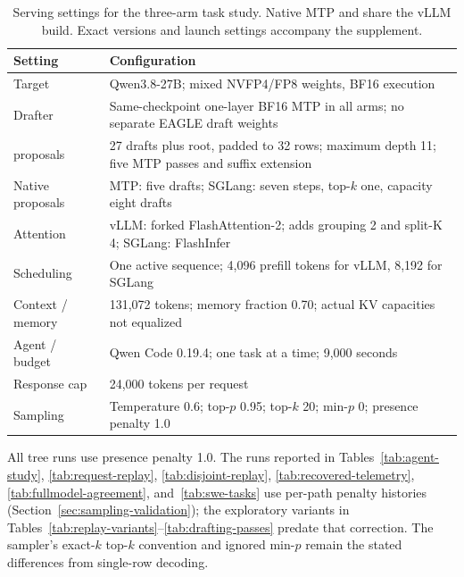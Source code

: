 \begin{table}[!htbp]
\caption{Serving settings for the three-arm task study. Native MTP and \sys{} share the vLLM build. Exact versions and launch settings accompany the supplement.}
\label{tab:serving-config}
\centering\footnotesize
\renewcommand{\arraystretch}{1.12}
\begin{tabularx}{\columnwidth}{@{}>{\raggedright\arraybackslash}p{}Y@{}}
\toprule
Setting & Configuration \\
\midrule
Target & Qwen3.8-27B; mixed NVFP4/FP8 weights, BF16 execution \\
Drafter & Same-checkpoint one-layer BF16 MTP in all arms; no separate EAGLE draft weights \\
\sys{} proposals & 27 drafts plus root, padded to 32 rows; maximum depth 11; five MTP passes and suffix extension \\
Native proposals & MTP: five drafts; SGLang: seven steps, top-$k$ one, capacity eight drafts \\
Attention & vLLM: forked FlashAttention-2; \sys{} adds grouping 2 and split-K 4; SGLang: FlashInfer \\
Scheduling & One active sequence; 4,096 prefill tokens for vLLM, 8,192 for SGLang \\
Context / memory & 131,072 tokens; memory fraction 0.70; actual KV capacities not equalized \\
Agent / budget & Qwen Code 0.19.4; one task at a time; 9,000 seconds \\
Response cap & 24,000 tokens per request \\
Sampling & Temperature 0.6; top-$p$ 0.95; top-$k$ 20; min-$p$ 0; presence penalty 1.0 \\
\bottomrule
\end{tabularx}
\end{table}

All tree runs use presence penalty 1.0. The runs reported in Tables~\ref{tab:agent-study}, \ref{tab:request-replay}, \ref{tab:disjoint-replay}, \ref{tab:recovered-telemetry}, \ref{tab:fullmodel-agreement}, and~\ref{tab:swe-tasks} use per-path penalty histories (Section~\ref{sec:sampling-validation}); the exploratory variants in Tables~\ref{tab:replay-variants}--\ref{tab:drafting-passes} predate that correction. The sampler's exact-$k$ top-$k$ convention and ignored min-$p$ remain the stated differences from single-row decoding.
